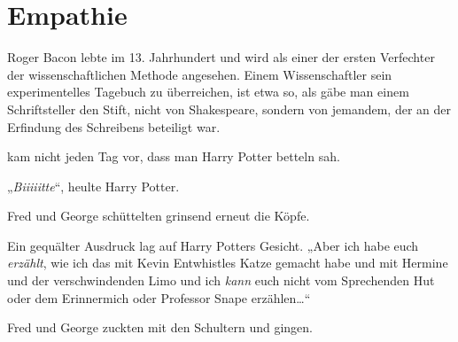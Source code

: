 \chapter{Empathie}

\begin{chapterOpeningAuthorNote}
%
Roger Bacon lebte im 13. Jahrhundert und wird als einer der ersten Verfechter der wissenschaftlichen Methode angesehen. Einem Wissenschaftler sein experimentelles Tagebuch zu überreichen, ist etwa so, als gäbe man einem Schriftsteller den Stift, nicht von Shakespeare, sondern von jemandem, der an der Erfindung des Schreibens beteiligt war.
\end{chapterOpeningAuthorNote}

 kam nicht jeden Tag vor, dass man Harry Potter betteln sah.

\hplettrineextrapara
„\emph{Biiiiitte}“, heulte Harry Potter.

Fred und George schüttelten grinsend erneut die Köpfe.

Ein gequälter Ausdruck lag auf Harry Potters Gesicht. „Aber ich habe euch \emph{erzählt}, wie ich das mit Kevin Entwhistles Katze gemacht habe und mit Hermine und der verschwindenden Limo und ich \emph{kann} euch nicht vom Sprechenden Hut oder dem Erinnermich oder Professor Snape erzählen…“

Fred und George zuckten mit den Schultern und gingen.

